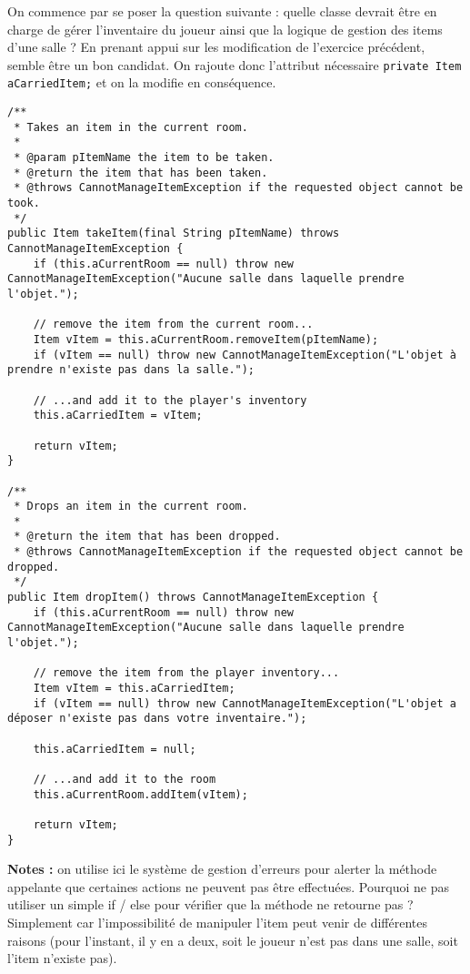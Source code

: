 \begin{exercise}[subtitle=Take et Drop]

On commence par se poser la question suivante : quelle classe devrait être en charge de gérer l'inventaire du joueur ainsi que la logique de gestion des items d'une salle ? En prenant appui sur les modification de l'exercice précédent,  semble être un bon candidat. On rajoute donc l'attribut nécessaire \texttt{private Item aCarriedItem;} et on la modifie en conséquence.

\begin{verbatim}
/**
 * Takes an item in the current room.
 *
 * @param pItemName the item to be taken.
 * @return the item that has been taken.
 * @throws CannotManageItemException if the requested object cannot be took.
 */
public Item takeItem(final String pItemName) throws CannotManageItemException {
    if (this.aCurrentRoom == null) throw new CannotManageItemException("Aucune salle dans laquelle prendre l'objet.");

    // remove the item from the current room...
    Item vItem = this.aCurrentRoom.removeItem(pItemName);
    if (vItem == null) throw new CannotManageItemException("L'objet à prendre n'existe pas dans la salle.");

    // ...and add it to the player's inventory
    this.aCarriedItem = vItem;

    return vItem;
}

/**
 * Drops an item in the current room.
 *
 * @return the item that has been dropped.
 * @throws CannotManageItemException if the requested object cannot be dropped.
 */
public Item dropItem() throws CannotManageItemException {
    if (this.aCurrentRoom == null) throw new CannotManageItemException("Aucune salle dans laquelle prendre l'objet.");

    // remove the item from the player inventory...
    Item vItem = this.aCarriedItem;
    if (vItem == null) throw new CannotManageItemException("L'objet a déposer n'existe pas dans votre inventaire.");
    
    this.aCarriedItem = null;
    
    // ...and add it to the room
    this.aCurrentRoom.addItem(vItem);

    return vItem;
}
\end{verbatim}

\textbf{Notes :} on utilise ici le système de gestion d'erreurs pour alerter la méthode appelante que certaines actions ne peuvent pas être effectuées. Pourquoi ne pas utiliser un simple if / else pour vérifier que la méthode ne retourne pas  ? Simplement car l'impossibilité de manipuler l'item peut venir de différentes raisons (pour l'instant, il y en a deux, soit le joueur n'est pas dans une salle, soit l'item n'existe pas).


\end{exercise}

